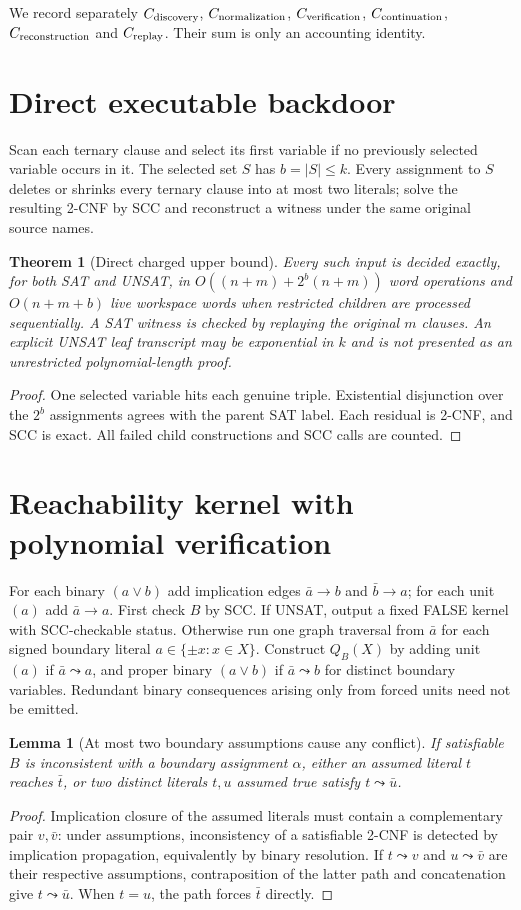 \documentclass[11pt]{article}
\newtheorem{theorem}{Theorem}
\newtheorem{lemma}{Lemma}
\begin{document}
We record separately $C_{\rm discovery}$, $C_{\rm normalization}$, $C_{\rm verification}$, $C_{\rm continuation}$, $C_{\rm reconstruction}$ and $C_{\rm replay}$. Their sum is only an accounting identity.
\section{Direct executable backdoor}
Scan each ternary clause and select its first variable if no previously selected variable occurs in it. The selected set $S$ has $b=|S|\le k$. Every assignment to $S$ deletes or shrinks every ternary clause into at most two literals; solve the resulting 2-CNF by SCC and reconstruct a witness under the same original source names.

\begin{theorem}[Direct charged upper bound]
Every such input is decided exactly, for both SAT and UNSAT, in $O((n+m)+2^b(n+m))$ word operations and $O(n+m+b)$ live workspace words when restricted children are processed sequentially. A SAT witness is checked by replaying the original $m$ clauses. An explicit UNSAT leaf transcript may be exponential in $k$ and is not presented as an unrestricted polynomial-length proof.
\end{theorem}
\begin{proof}One selected variable hits each genuine triple. Existential disjunction over the $2^b$ assignments agrees with the parent SAT label. Each residual is 2-CNF, and SCC is exact. All failed child constructions and SCC calls are counted.\end{proof}

\section{Reachability kernel with polynomial verification}
For each binary $(a\vee b)$ add implication edges $\bar a\to b$ and $\bar b\to a$; for each unit $(a)$ add $\bar a\to a$. First check $B$ by SCC. If UNSAT, output a fixed FALSE kernel with SCC-checkable status. Otherwise run one graph traversal from $\bar a$ for each signed boundary literal $a\in\{\pm x:x\in X\}$. Construct $Q_B(X)$ by adding unit $(a)$ if $\bar a\leadsto a$, and proper binary $(a\vee b)$ if $\bar a\leadsto b$ for distinct boundary variables. Redundant binary consequences arising only from forced units need not be emitted.

\begin{lemma}[At most two boundary assumptions cause any conflict]
If satisfiable $B$ is inconsistent with a boundary assignment $\alpha$, either an assumed literal $t$ reaches $\bar t$, or two distinct literals $t,u$ assumed true satisfy $t\leadsto\bar u$.
\end{lemma}
\begin{proof}Implication closure of the assumed literals must contain a complementary pair $v,\bar v$: under assumptions, inconsistency of a satisfiable 2-CNF is detected by implication propagation, equivalently by binary resolution. If $t\leadsto v$ and $u\leadsto\bar v$ are their respective assumptions, contraposition of the latter path and concatenation give $t\leadsto\bar u$. When $t=u$, the path forces $\bar t$ directly.\end{proof}
\end{document}
